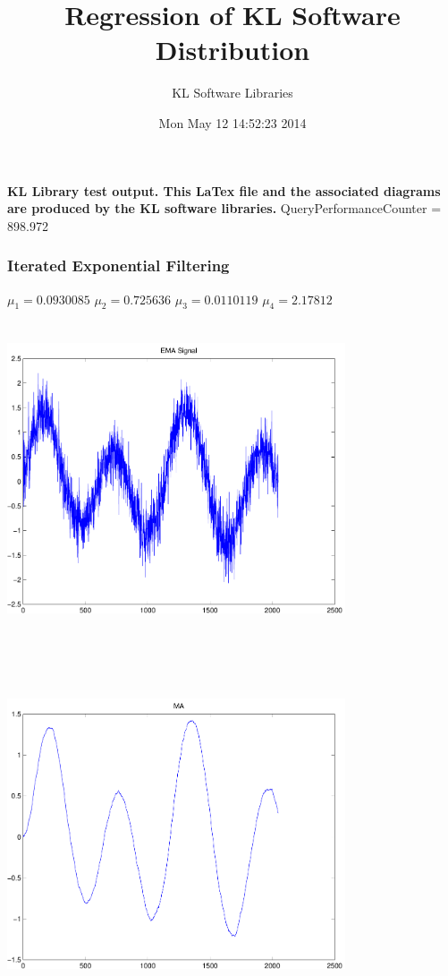 \documentclass[9pt]{article}
\theoremstyle{plain}
\theoremstyle{definition}
\theoremstyle{remark}
\numberwithin{equation}{section}
\begin{document}
\title{Regression of KL Software Distribution   }
\author{KL Software Libraries}
\date{Mon May 12 14:52:23 2014
}
\maketitle
\textbf{ KL Library test output.  This LaTex file and the associated diagrams are produced by the KL software libraries.}
QueryPerformanceCounter  =  898.972
\subsubsection{Iterated Exponential Filtering }
$\mu_1 =0.0930085$
$\mu_2 =0.725636$
$\mu_3 =0.0110119$
$\mu_4 =2.17812$
\includegraphics[width=10.0cm,height=10.0cm]{EMA_signal.pdf}

\includegraphics[width=10.0cm,height=10.0cm]{MA.pdf}
\end{document}
